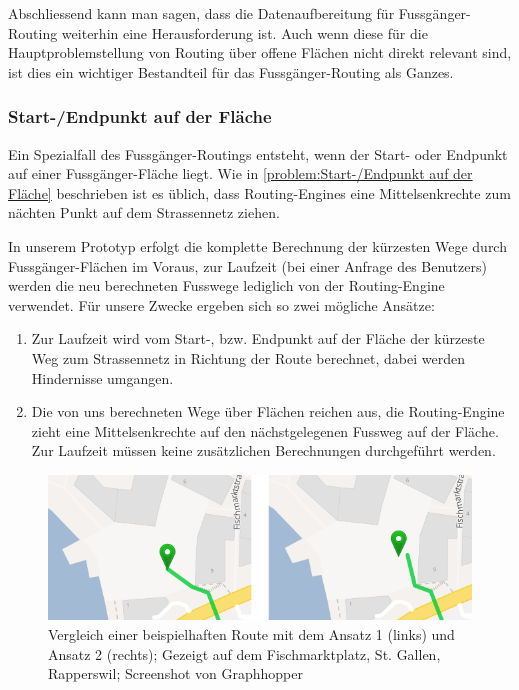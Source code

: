 Abschliessend kann man sagen, dass die Datenaufbereitung für Fussgänger-Routing weiterhin eine Herausforderung ist. Auch wenn diese für die Hauptproblemstellung von Routing über offene Flächen nicht direkt relevant sind, ist dies ein wichtiger Bestandteil für das Fussgänger-Routing als Ganzes.


\subsubsection{Start-/Endpunkt auf der Fläche}
\label{subsub:Start-/Endpunkt auf der Fläche}
Ein Spezialfall des Fussgänger-Routings entsteht, wenn der Start- oder Endpunkt auf einer Fussgänger-Fläche liegt. Wie in \ref{problem:Start-/Endpunkt auf der Fläche} beschrieben ist es üblich, dass Routing-Engines eine Mittelsenkrechte zum nächten Punkt auf dem Strassennetz ziehen.

In unserem Prototyp erfolgt die komplette Berechnung der kürzesten Wege durch Fussgänger-Flächen im Voraus, zur Laufzeit (bei einer Anfrage des Benutzers) werden die neu berechneten Fusswege lediglich von der Routing-Engine verwendet. Für unsere Zwecke ergeben sich so zwei mögliche Ansätze:

\begin{enumerate}
    \item Zur Laufzeit wird vom Start-, bzw. Endpunkt auf der Fläche der kürzeste Weg zum Strassennetz in Richtung der Route berechnet, dabei werden Hindernisse umgangen.
    \item Die von uns berechneten Wege über Flächen reichen aus, die Routing-Engine zieht eine Mittelsenkrechte auf den nächstgelegenen Fussweg auf der Fläche. Zur Laufzeit müssen keine zusätzlichen Berechnungen durchgeführt werden.
\end{enumerate}

\begin{figure}[ht]
    \centering
    \includegraphics[width=1\linewidth]{technicalreport/img/vergleich_start-punkt-auf-flaeche}
    \caption[Vergleich der Ansätze wenn Startpunkt auf Fläche]{Vergleich einer beispielhaften Route mit dem Ansatz 1 (links) und Ansatz 2 (rechts); Gezeigt auf dem Fischmarktplatz, St. Gallen, Rapperswil; Screenshot von Graphhopper \cite{graphhopper}}
    \label{fig:vergleich_start-punkt_auf_fläche}
\end{figure}


